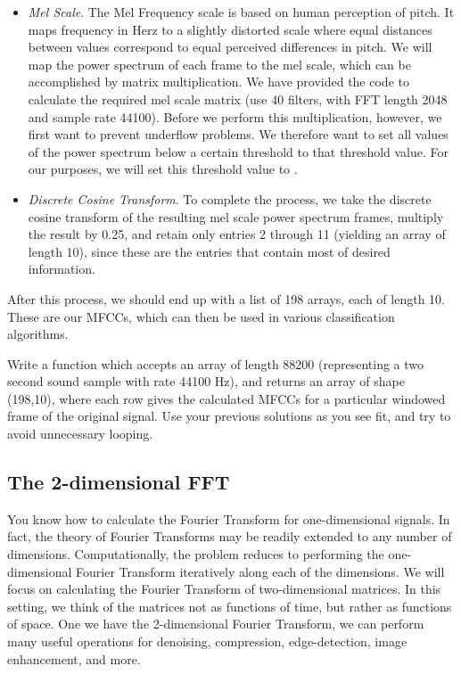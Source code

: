 \begin{itemize}
\item \emph{Mel Scale}. The Mel Frequency scale is based on human perception of pitch. It maps frequency
in Herz to a slightly distorted scale where equal distances between values correspond to equal perceived 
differences in pitch. We will map the power spectrum of each frame to the mel scale, which can be 
accomplished by matrix multiplication. We have provided the code to calculate the required mel scale
matrix (use 40 filters, with FFT length 2048 and sample rate 44100).
Before we perform this multiplication, however, we first want to prevent underflow problems. We
therefore want to set all values of the power spectrum below a certain threshold to that threshold value.
For our purposes, we will set this threshold value to . 

\item \emph{Discrete Cosine Transform}. To complete the process, we take the discrete cosine transform
of the resulting mel scale power spectrum frames, multiply the result by 0.25, and retain only entries 2 
through 11 (yielding an array of length 10), since these are the entries that contain most of desired 
information.
\end{itemize}
After this process, we should end up with a list of 198 arrays, each of length 10. These are our MFCCs,
which can then be used in various classification algorithms. 

\begin{problem}
Write a function  which accepts an array of length 88200 (representing a two second sound sample
with rate 44100 Hz), and returns an array of shape (198,10), where each row gives the calculated MFCCs for 
a particular windowed frame of the original signal. Use your previous solutions as you see fit, and try to
avoid unnecessary looping.
\end{problem}

\subsection*{The 2-dimensional FFT}
You know how to calculate the Fourier Transform for one-dimensional signals. In fact, the theory of 
Fourier Transforms may be readily extended to any number of dimensions.
Computationally, the problem reduces to performing the one-dimensional Fourier Transform iteratively
along each of the dimensions. We will focus on calculating the Fourier Transform of two-dimensional 
matrices. In this setting, we think of the matrices not as functions of time, but rather as functions of
space. One we have the 2-dimensional Fourier Transform, we can perform many useful operations for
denoising, compression, edge-detection, image enhancement, and more. 

